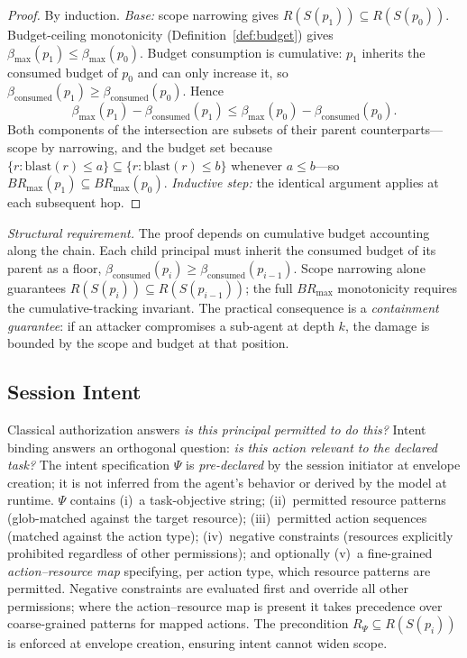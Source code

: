 \documentclass[sigconf,nonacm]{acmart}
\begin{document}
\begin{proof}
By induction. \emph{Base:} scope narrowing gives $R(S(p_1)) \subseteq R(S(p_0))$. Budget-ceiling monotonicity (Definition~\ref{def:budget}) gives $\beta_{\max}(p_1) \leq \beta_{\max}(p_0)$. Budget consumption is cumulative: $p_1$ inherits the consumed budget of $p_0$ and can only increase it, so $\beta_{\mathrm{consumed}}(p_1) \geq \beta_{\mathrm{consumed}}(p_0)$. Hence
\[
\beta_{\max}(p_1) - \beta_{\mathrm{consumed}}(p_1) \leq \beta_{\max}(p_0) - \beta_{\mathrm{consumed}}(p_0).
\]
Both components of the intersection are subsets of their parent counterparts---scope by narrowing, and the budget set because $\{r : \mathrm{blast}(r) \leq a\} \subseteq \{r : \mathrm{blast}(r) \leq b\}$ whenever $a \leq b$---so $BR_{\max}(p_1) \subseteq BR_{\max}(p_0)$. \emph{Inductive step:} the identical argument applies at each subsequent hop.
\end{proof}

\noindent\emph{Structural requirement.} The proof depends on cumulative budget accounting along the chain. Each child principal must inherit the consumed budget of its parent as a floor, $\beta_{\mathrm{consumed}}(p_i) \geq \beta_{\mathrm{consumed}}(p_{i-1})$. Scope narrowing alone guarantees $R(S(p_i)) \subseteq R(S(p_{i-1}))$; the full $BR_{\max}$ monotonicity requires the cumulative-tracking invariant. The practical consequence is a \emph{containment guarantee}: if an attacker compromises a sub-agent at depth $k$, the damage is bounded by the scope and budget at that position.

\subsection{Session Intent}\label{sec:intent}

Classical authorization answers \emph{is this principal permitted to do this?} Intent binding answers an orthogonal question: \emph{is this action relevant to the declared task?} The intent specification $\Psi$ is \emph{pre-declared} by the session initiator at envelope creation; it is not inferred from the agent's behavior or derived by the model at runtime. $\Psi$ contains (i)~a task-objective string; (ii)~permitted resource patterns (glob-matched against the target resource); (iii)~permitted action sequences (matched against the action type); (iv)~negative constraints (resources explicitly prohibited regardless of other permissions); and optionally (v)~a fine-grained \emph{action--resource map} specifying, per action type, which resource patterns are permitted. Negative constraints are evaluated first and override all other permissions; where the action--resource map is present it takes precedence over coarse-grained patterns for mapped actions. The precondition $R_\Psi \subseteq R(S(p_i))$ is enforced at envelope creation, ensuring intent cannot widen scope.
\end{document}
